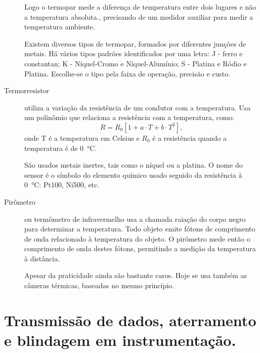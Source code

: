 \begin{description}
Logo o termopar mede a diferença de temperatura entre dois lugares e não a temperatura absoluta., precisando de um medidor auxiliar para medir a temperatura ambiente.

Existem diversos tipos de termopar, formados por diferentes junções de metais. Há vários tipos padrões identificados por uma letra: J - ferro e constantan; K - Níquel-Cromo e Níquel-Alumínio; S - Platina e Ródio e Platina. Escolhe-se o tipo pela faixa de operação, precisão e custo.

  \item[Termorresistor] utiliza a variação da resistência de um condutor com a temperatura. Usa um polinômio que relaciona a resistência com a temperatura, como:
  \[
R = R_0[1+a\cdot T+b\cdot T^2],
  \]
onde T é a temperatura em Celsius e $R_0$ é a resistência quando a temperatura é de \SI{0}{\celsius}.

São usados metais inertes, tais como o níquel ou a platina. O nome do sensor é o símbolo do elemento químico usado seguido da resistência à \SI{0}{\celsius}: Pt100, Ni500, etc.
  \item[Pirômetro] ou termômetro de infravermelho usa a chamada raiação do corpo negro para determinar a temperatura. Todo objeto emite fótons de comprimento de onda relacionado à temperatura do objeto. O pirômetro mede então o comprimento de onda destes fótons, permitindo a medição da temperatura à distância.

  Apesar da praticidade ainda são bastante caros. Hoje se usa também as câmeras térmicas, baseadas no mesmo princípio.
\end{description}

\section{Transmissão de dados, aterramento e blindagem em instrumentação.}
